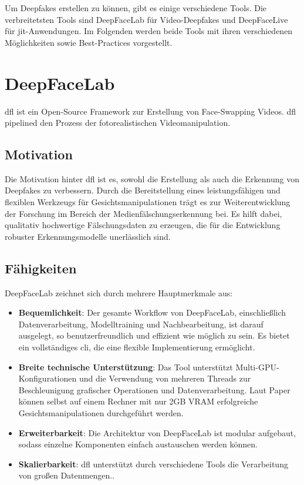Um Deepfakes erstellen zu können, gibt es einige verschiedene Tools.
Die verbreitetsten Tools sind DeepFaceLab für Video-Deepfakes und DeepFaceLive für \gls{jit}-Anwendungen.
Im Folgenden werden beide Tools mit ihren verschiedenen Möglichkeiten sowie Best-Practices vorgestellt.

\section{DeepFaceLab}\label{sec:deepfacelab}
\gls{dfl} ist ein Open-Source Framework zur Erstellung von Face-Swapping Videos.
\gls{dfl} pipelined den Prozess der fotorealistischen Videomanipulation.

\subsection{Motivation}\label{subsec:motivation}
Die Motivation hinter \gls{dfl} ist es, sowohl die Erstellung als auch die Erkennung von Deepfakes zu verbessern.
Durch die Bereitstellung eines leistungsfähigen und flexiblen Werkzeugs für Gesichtsmanipulationen trägt es zur Weiterentwicklung der Forschung im Bereich der Medienfälschungserkennung bei.
Es hilft dabei, qualitativ hochwertige Fälschungsdaten zu erzeugen, die für die Entwicklung robuster Erkennungsmodelle unerlässlich sind\cite{deepfacelabintegratedflexibleextensible, deepfacelab}.

\subsection{Fähigkeiten}\label{subsec:fahigkeiten}
DeepFaceLab zeichnet sich durch mehrere Hauptmerkmale aus:
\begin{itemize}
    \item \textbf{Bequemlichkeit}: Der gesamte Workflow von DeepFaceLab, einschließlich Datenverarbeitung, Modelltraining und Nachbearbeitung, ist darauf ausgelegt, so benutzerfreundlich und effizient wie möglich zu sein.
     Es bietet ein vollständiges \gls{cli}, die eine flexible Implementierung ermöglicht.
    \item \textbf{Breite technische Unterstützung}: Das Tool unterstützt Multi-GPU-Konfigurationen und die Verwendung von mehreren Threads zur Beschleunigung grafischer Operationen und Datenverarbeitung.
     Laut Paper können selbst auf einem Rechner mit nur 2GB VRAM erfolgreiche Gesichtsmanipulationen durchgeführt werden\cite{deepfacelabintegratedflexibleextensible}.
    \item \textbf{Erweiterbarkeit}: Die Architektur von DeepFaceLab ist modular aufgebaut, sodass einzelne Komponenten einfach austauschen werden können\cite{deepfacelabintegratedflexibleextensible}.
    \item \textbf{Skalierbarkeit}: \gls{dfl} unterstützt durch verschiedene Tools die Verarbeitung von großen Datenmengen.\cite{deepfacelabintegratedflexibleextensible}.
\end{itemize}

